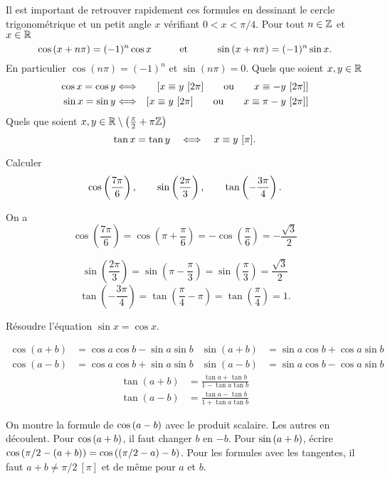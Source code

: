 \documentclass{magnolia}
\begin{document}
\begin{remarques}
\remarque Il est important de retrouver rapidement ces formules en dessinant le cercle trigonométrique et un \og petit \fg angle $x$ vérifiant $0<x<\pi/4$.
\remarque Pour tout $n\in\mathbb{Z}$ et $x\in\mathbb{R}$
  \[\cos\left(x+n\pi\right)=(-1)^n \cos x \qquad\quad\!\text{et}\quad\!\qquad \sin\left(x+n\pi\right)=(-1)^n \sin x.\]
  En particulier $\cos(n\pi)=(-1)^n$ et $\sin(n\pi)=0$. 
\remarque Quels que soient $x,y\in\mathbb{R}$
  \begin{eqnarray*}
  \cos x = \cos y &\Longleftrightarrow& \left[x\equiv y \ [2\pi] \qquad\text{ou}\qquad
    x\equiv -y \ [2\pi]\right]\\
  \sin x = \sin y &\Longleftrightarrow& \left[x\equiv y \ [2\pi] \qquad\text{ou}\qquad
    x\equiv \pi-y \ [2\pi]\right]
  \end{eqnarray*}
\remarque Quels que soient $x,y\in\mathbb{R}\setminus\left(\frac{\pi}{2}+\pi\mathbb{Z}\right)$
  \[\tan x=\tan y \quad\ssi\quad x\equiv y\ [\pi].\]
\end{remarques}

\begin{exos}
\exo Calculer
  \[\cos\left(\frac{7\pi}{6}\right), \qquad \sin\left(\frac{2\pi}{3}\right), \qquad
    \tan\left(-\frac{3\pi}{4}\right).\]
  \begin{sol}
  On a
\[\cos\left( \frac{7\pi}{6} \right)=\cos\left( \pi+\frac{\pi}{6} \right)=-\cos\left( \frac{\pi}{6} \right)=-\frac{\sqrt{3}}{2}\]

\[\sin\left( \frac{2\pi}{3} \right)=\sin\left( \pi-\frac{\pi}{3} \right)=\sin\left( \frac{\pi}{3} \right)=\frac{\sqrt{3}}{2}\]
\[\tan\left( -\frac{3\pi}{4}\right) =\tan\left(\frac{\pi}{4}-\pi\right) =\tan\left(\frac{\pi}{4}\right) =1.\]
  \end{sol}
\exo Résoudre l'équation $\sin x=\cos x$.
\end{exos}

\begin{proposition}[nom={Addition des arcs}]
\begin{align*}
\cos(a+b)&=\cos a\cos b-\sin a\sin b &\sin(a+b)&=\sin a\cos b+\cos a\sin b\\
\cos(a-b)&=\cos a\cos b+\sin a\sin b &\sin(a-b)&=\sin a\cos b-\cos a\sin b
\end{align*}
\begin{align*}
\tan(a+b)&=\frac{\tan a+\tan b}{1-\tan a\tan b}\\
\tan(a-b)&=\frac{\tan a-\tan b}{1+\tan a\tan b}
\end{align*}
\end{proposition}
\begin{preuve}
On montre la formule de $\cos\left(a-b\right)$ avec le produit scalaire. Les autres en
découlent. Pour $\cos\left(a+b\right)$, il faut changer $b$ en $-b$. Pour
$\sin\left(a+b\right)$, écrire $\cos\left(\pi/2-\left(a+b\right)\right)=\cos\left(\left(\pi/2-a\right)-b\right)$.
Pour les formules avec les tangentes, il faut $a+b\neq \pi/2\ [\pi]$ et
de même pour $a$ et $b$. 
\end{preuve}
\end{document}
